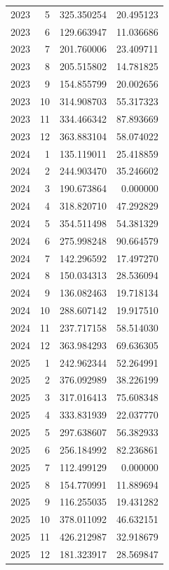 \begin{tabular}{rrrr}
2023 & 5 & 325.350254 & 20.495123 \\
2023 & 6 & 129.663947 & 11.036686 \\
2023 & 7 & 201.760006 & 23.409711 \\
2023 & 8 & 205.515802 & 14.781825 \\
2023 & 9 & 154.855799 & 20.002656 \\
2023 & 10 & 314.908703 & 55.317323 \\
2023 & 11 & 334.466342 & 87.893669 \\
2023 & 12 & 363.883104 & 58.074022 \\
2024 & 1 & 135.119011 & 25.418859 \\
2024 & 2 & 244.903470 & 35.246602 \\
2024 & 3 & 190.673864 & 0.000000 \\
2024 & 4 & 318.820710 & 47.292829 \\
2024 & 5 & 354.511498 & 54.381329 \\
2024 & 6 & 275.998248 & 90.664579 \\
2024 & 7 & 142.296592 & 17.497270 \\
2024 & 8 & 150.034313 & 28.536094 \\
2024 & 9 & 136.082463 & 19.718134 \\
2024 & 10 & 288.607142 & 19.917510 \\
2024 & 11 & 237.717158 & 58.514030 \\
2024 & 12 & 363.984293 & 69.636305 \\
2025 & 1 & 242.962344 & 52.264991 \\
2025 & 2 & 376.092989 & 38.226199 \\
2025 & 3 & 317.016413 & 75.608348 \\
2025 & 4 & 333.831939 & 22.037770 \\
2025 & 5 & 297.638607 & 56.382933 \\
2025 & 6 & 256.184992 & 82.236861 \\
2025 & 7 & 112.499129 & 0.000000 \\
2025 & 8 & 154.770991 & 11.889694 \\
2025 & 9 & 116.255035 & 19.431282 \\
2025 & 10 & 378.011092 & 46.632151 \\
2025 & 11 & 426.212987 & 32.918679 \\
2025 & 12 & 181.323917 & 28.569847 \\
\bottomrule
\end{tabular}
